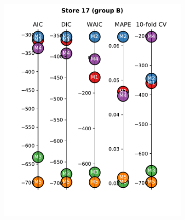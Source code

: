 \documentclass[english, 12pt, a4paper, sci, utf8, a-1b, online]{aaltothesis}
\begin{document}
\begin{abstractpage}[english]
\begin{figure}[hbt]
\begin{subfigure}[htb]{0.33\textwidth}
		\includegraphics[width=\textwidth]{../plots/metrics/metrics_plot_single_store_17_of_B.pdf}
	\end{subfigure}
	\hfill
	\begin{subfigure}[htb]{0.33\textwidth}
		\centering

\end{subfigure}
\end{figure}
\end{abstractpage}
\end{document}
